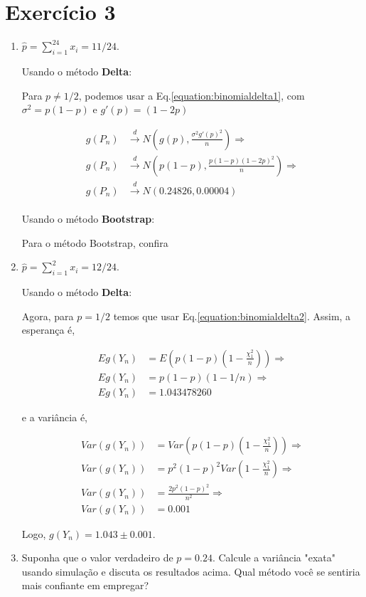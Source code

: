\documentclass[11pt]{article}
\newenvironment{qparts}{\begin{enumerate}[{(}a{)}]}{\end{enumerate}}
\begin{document}
\section*{Exercício 3}
\begin{qparts}
	
\item $\hat{p}=\sum_{i=1}^24x_i=11/24$.


Usando o método \textbf{Delta}:

Para $p\neq1/2$, podemos usar a Eq.\ref{equation:binomialdelta1}, com $\sigma^2=p(1-p)$ e $g'(p)=(1-2p)$

\begin{subequations}
	\begin{align}
		g(P_n) &\xrightarrow[]{d} N(g(p), \frac{\sigma^2 g'(p)^2}{n}) \Rightarrow \\
		g(P_n) &\xrightarrow[]{d} N\left(p(1-p), \frac{p(1-p) (1-2p)^2}{n}\right) \Rightarrow \\
		g(P_n) &\xrightarrow[]{d} N\left(0.24826, 0.00004\right)
	\end{align}
\end{subequations}

Usando o método \textbf{Bootstrap}:

Para o método Bootstrap, confira 

\item $\hat{p}=\sum_{i=1}^2x_i=12/24$.

Usando o método \textbf{Delta}:

Agora, para $p=1/2$ temos que usar Eq.\ref{equation:binomialdelta2}. Assim, a esperança é,

\begin{subequations}
	\begin{align}
		Eg(Y_n) &= E\left(p(1-p)\left(1-\frac{\chi^2_1}{n}\right)\right) \Rightarrow \\
		Eg(Y_n) &= p(1-p)(1-1/n) \Rightarrow \\
		Eg(Y_n) &= 1.043478260
	\end{align}
\end{subequations}

e a variância é,

\begin{subequations}
	\begin{align}
		Var(g(Y_n)) &= Var\left(p(1-p)\left(1-\frac{\chi^2_1}{n}\right)\right) \Rightarrow \\
		Var(g(Y_n)) &= p^2(1-p)^2Var(1-\frac{\chi^2_1}{n}) \Rightarrow \\
		Var(g(Y_n)) &= \frac{2p^2(1-p)^2}{n^2} \Rightarrow \\
		Var(g(Y_n)) &= 0.001
	\end{align}
\end{subequations}

Logo, $g(Y_n) = 1.043 \pm 0.001$.


\item Suponha que o valor verdadeiro de $p=0.24$. Calcule a variância "exata" usando simulação e discuta os resultados acima. Qual método você se sentiria mais confiante em empregar?

	
\end{qparts}
\end{document}
